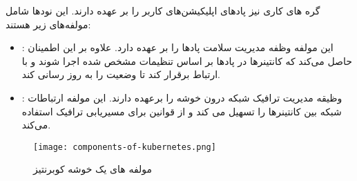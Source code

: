 گره های کاری نیز پادهای اپلیکیشن‌های کاربر را بر عهده دارند. این نودها شامل مولفه‌های زیر هستند:
\begin{itemize}
	\item 
{}:
 این مولفه وظفه مدیریت سلامت پادها را بر عهده دارد. علاوه بر این اطمینان حاصل می‌کند که کانتینرها در پادها بر اساس تنظیمات مشخص شده اجرا شوند و با  ارتباط برقرار کند تا وضعیت را به روز رسانی کند.
 	\item
{}: 
 وظیقه مدیریت ترافیک شبکه درون خوشه را برعهده دارند. این مولفه ارتباطات شبکه بین کانتینرها را تسهیل می کند و از قوانین  برای مسیریابی ترافیک استفاده می‌کند.
\end{itemize}


\begin{figure}[t]
	\centering
	\texttt{[image: components-of-kubernetes.png]}
	\caption{مولفه های یک خوشه کوبرنتیز}
	\label{fig: components of kuber}
\end{figure}
































